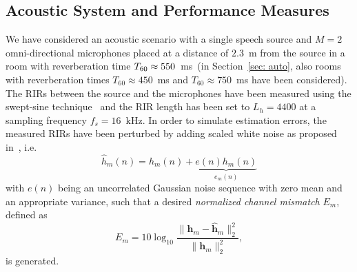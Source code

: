 \documentclass[10pt]{IEEEtran}
\begin{document}
\subsection{Acoustic System and Performance Measures}
\label{sec: acsys}
We have considered an acoustic scenario with a single speech source and $M=2$ omni-directional microphones placed at a distance of $2.3$~m from the source in a room with reverberation time $T_{\rm 60} \approx 550$~ms~(in Section~\ref{sec: auto}, also rooms with reverberation times $T_{60} \approx 450$~ms and $T_{60} \approx 750$~ms have been considered).
The RIRs between the source and the microphones have been measured using the swept-sine technique~\cite{Farina_2000} and the RIR length has been set to $L_h = 4400$ at a sampling frequency $f_s = 16$~kHz.
In order to simulate estimation errors, the measured RIRs have been perturbed by adding scaled white noise as proposed in~\cite{Cho_ITSA_1999}, i.e.
\begin{equation}
  \label{eq: he}
  \hat{h}_m(n) = h_m(n) + \underbrace{e(n)h_m(n)}_{e_m(n)}
\end{equation}
with $e(n)$ being an uncorrelated Gaussian noise sequence with zero mean and an appropriate variance, such that a desired \emph{normalized channel mismatch} $E_m$, defined as
\begin{equation}
  \label{eq: em}
E_m = 10 \log_{10} \frac{\|\mathbf{h}_m - \hat{\mathbf{h}}_m \|_2^2}{\|\mathbf{h}_m\|_2^2},
\end{equation}
is generated.
\end{document}
